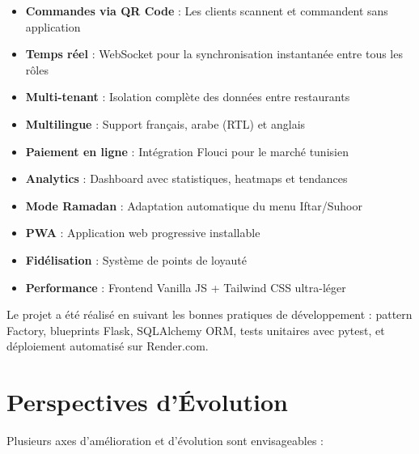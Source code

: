 \documentclass[12pt,a4paper]{report}
\begin{document}
\begin{itemize}[leftmargin=1.5cm, itemsep=0.3cm]
    \item \textbf{Commandes via QR Code} : Les clients scannent et commandent sans application
    \item \textbf{Temps réel} : WebSocket pour la synchronisation instantanée entre tous les rôles
    \item \textbf{Multi-tenant} : Isolation complète des données entre restaurants
    \item \textbf{Multilingue} : Support français, arabe (RTL) et anglais
    \item \textbf{Paiement en ligne} : Intégration Flouci pour le marché tunisien
    \item \textbf{Analytics} : Dashboard avec statistiques, heatmaps et tendances
    \item \textbf{Mode Ramadan} : Adaptation automatique du menu Iftar/Suhoor
    \item \textbf{PWA} : Application web progressive installable
    \item \textbf{Fidélisation} : Système de points de loyauté
    \item \textbf{Performance} : Frontend Vanilla JS + Tailwind CSS ultra-léger
\end{itemize}

Le projet a été réalisé en suivant les bonnes pratiques de développement : pattern Factory, blueprints Flask, SQLAlchemy ORM, tests unitaires avec pytest, et déploiement automatisé sur Render.com.

\section*{Perspectives d'Évolution}

Plusieurs axes d'amélioration et d'évolution sont envisageables :
\end{document}
